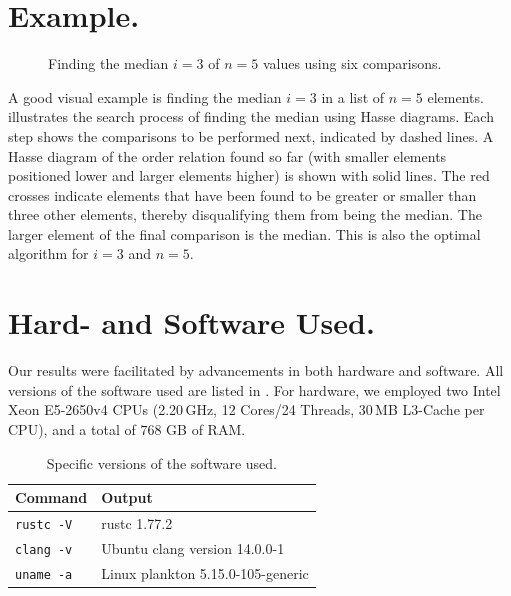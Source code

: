\documentclass[a4paper,UKenglish,cleveref, autoref, thm-restate]{lipics-v2021}
\begin{document}




\clearpage
\appendix

\section{Example.}
\begin{figure}[!b]
  \centering
  
  \caption{Finding the median $i = 3$ of $n = 5$ values using six comparisons.}
  \label{fig:median_of_5}
\end{figure}

A good visual example is finding the median $i = 3$ in a list of $n = 5$ elements.
 illustrates the search process of finding the median using Hasse diagrams.
Each step shows the comparisons to be performed next, indicated by dashed lines.
A Hasse diagram of the order relation found so far (with smaller elements positioned lower and larger elements higher) is shown with solid lines.
The red crosses indicate elements that have been found to be greater or smaller than three other elements, thereby disqualifying them from being the median.
The larger element of the final comparison is the median.
This is also the optimal algorithm for $i = 3$ and $n = 5$.






\section{Hard- and Software Used.} \label{sec:hardware}

Our results were facilitated by advancements in both hardware and software.
All versions of the software used are listed in .
For hardware, we employed two Intel Xeon E5-2650v4 CPUs (2.20\,GHz, 12 Cores/24 Threads, 30\,MB L3-Cache per CPU), and a total of $768$ GB of RAM.

\begin{table}[!t]
  \renewcommand{\arraystretch}{1.1}
  \caption{Specific versions of the software used.}
  \label{table:command_outputs}
  \centering
  \small
  \begin{tabular}{l|l}
    \textbf{Command}  & \textbf{Output}                   \\ \hline
    \texttt{rustc -V} & rustc 1.77.2                      \\ \hline
    \texttt{clang -v} & Ubuntu clang version 14.0.0-1     \\ \hline
    \texttt{uname -a} & Linux plankton 5.15.0-105-generic \\
  \end{tabular}
\end{table}
\end{document}
